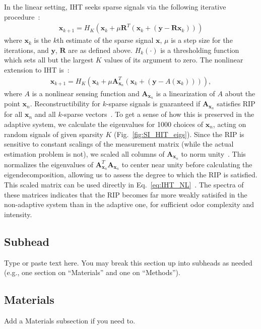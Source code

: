 \documentclass[9pt,twoside]{pnas-new}
\begin{document}
In the linear setting, IHT seeks sparse signals via the following iterative procedure~\cite{IHT}:
\begin{align}
    \mathbf{x}_{k + 1} = H_K(\mathbf{x}_k + \mu\mathbf{R}^T(\mathbf {x}_k + (\mathbf y - \mathbf R\mathbf {x}_k)))
    \label{eq:IHT}
\end{align}
where $\mathbf{x}_k$ is the $k$th estimate of the sparse signal $\mathbf{x}$, $\mu$ is a step size for the iterations, and $\mathbf y$, $\mathbf R$ are as defined above. $H_k(\cdot)$ is a thresholding function which sets all but the largest $K$ values of its argument to zero. The nonlinear extension to IHT is~\cite{nonlin_CS}: 
\begin{align}
    \mathbf{x}_{k + 1} = H_K(\mathbf{x}_k + \mu\mathbf{A}_{\mathbf x_n}^T(\mathbf {x}_k + (\mathbf y - A(\mathbf {x}_k)))),
    \label{eq:IHT_NL}
\end{align}
where $A$ is a nonlinear sensing function and $\mathbf{A}_{\mathbf x_n}$ is a linearization of $A$ about the point $\mathbf x_n$. Reconstructibility for $k$-sparse signals is guaranteed if $\mathbf{A}_{\mathbf x_n}$ satisfies RIP for all $\mathbf x_n$ and all $k$-sparse vectors~\cite{IHT}. To get a sense of how this is preserved in the adaptive system, we calculate the eigenvalues for 1000 choices of $\mathbf x_n$, acting on random signals of given sparsity $K$ (Fig.~\ref{fig:SI_HIT_eigs}). Since the RIP is sensitive to constant scalings of the measurement matrix (while the actual estimation problem is not), we scaled all columns of $\mathbf{A}_{\mathbf x_n}$ to norm unity~\cite{using_IHT}. This normalizes the eigenvalues of $\mathbf{A}^T_{\mathbf x_n}\mathbf{A}_{\mathbf x_n}$ to center near unity before calculating the eigendecomposition, allowing us to assess the degree to which the RIP is satisfied. This scaled matrix can be used directly in Eq.~\ref{eq:IHT_NL}~\cite{nonlin_CS,using_IHT}. The spectra of these matrices indicates that the RIP becomes far more weakly satisifed in the non-adaptive system than in the adaptive one, for sufficient odor complexity and intensity.



\iffalse
\subsection*{Subhead}
Type or paste text here. You may break this section up into subheads as needed (e.g., one section on ``Materials'' and one on ``Methods'').

\subsection*{Materials}
Add a Materials subsection if you need to.
\end{document}
